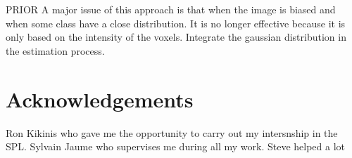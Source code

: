 PRIOR
A major issue of this approach is that when the image is biased and when some class have a close distribution. It is no longer effective because it is only based on the intensity of the voxels. Integrate the gaussian distribution in the estimation process.

\newpage
\section*{Acknowledgements}
Ron Kikinis who gave me the opportunity to carry out my intersnship in the SPL.
Sylvain Jaume who supervises me during all my work.
Steve  helped a lot

